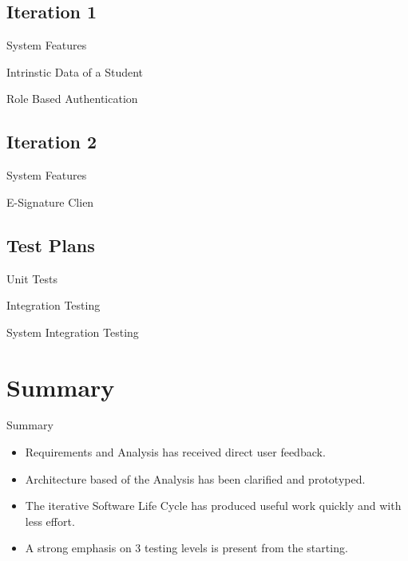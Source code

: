 \documentclass{beamer}
\begin{document}
\subsection{Iteration 1}
\begin{frame}{System Features}
\end{frame}
\begin{frame}{Intrinstic Data of a Student}
\end{frame}
\begin{frame}{Role Based Authentication}
\end{frame}

\subsection{Iteration 2}
\begin{frame}{System Features}
\end{frame}
\begin{frame}{E-Signature Clien}
\end{frame}

\subsection{Test Plans}
\begin{frame}{Unit Tests}
\end{frame}
\begin{frame}{Integration Testing}
\end{frame}
\begin{frame}{System Integration Testing}
\end{frame}





\section*{Summary}

\begin{frame}{Summary}

\begin{itemize}
\item
Requirements and Analysis has received direct user feedback.
\item
Architecture based of the Analysis has been clarified and prototyped. 
\item 
The iterative Software Life Cycle has produced useful work quickly and with less effort.
\item
A strong emphasis on 3 testing levels is present from the starting.
\end{itemize}
\end{frame}
\end{document}
